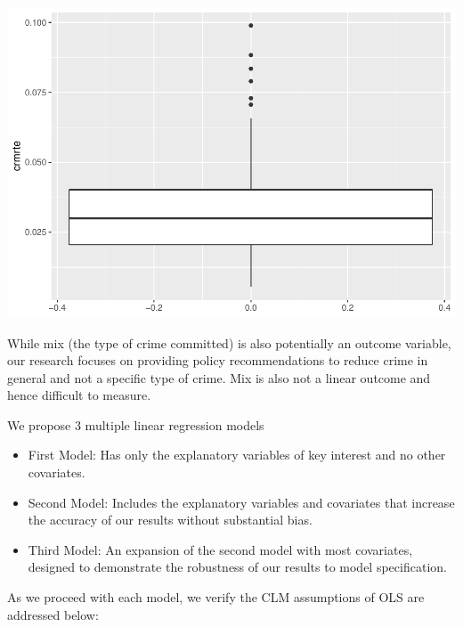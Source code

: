 \documentclass[]{article}
\begin{document}
\includegraphics{Bagnard_Gaustad_Hartman_Leung_Lab_3_files/figure-latex/unnamed-chunk-62-1.pdf}

While mix (the type of crime committed) is also potentially an outcome
variable, our research focuses on providing policy recommendations to
reduce crime in general and not a specific type of crime. Mix is also
not a linear outcome and hence difficult to measure.

We propose 3 multiple linear regression models

\begin{itemize}
\item
  First Model: Has only the explanatory variables of key interest and no
  other covariates.
\item
  Second Model: Includes the explanatory variables and covariates that
  increase the accuracy of our results without substantial bias.
\item
  Third Model: An expansion of the second model with most covariates,
  designed to demonstrate the robustness of our results to model
  specification.
\end{itemize}

As we proceed with each model, we verify the CLM assumptions of OLS are
addressed below:
\end{document}
